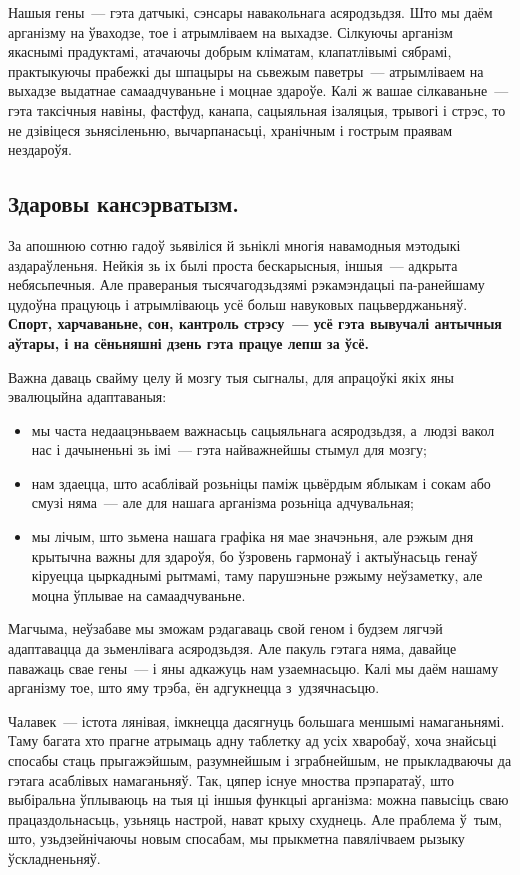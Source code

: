 Нашыя гены~--- гэта датчыкі, сэнсары навакольнага асяродзьдзя. Што мы даём арганізму на ўваходзе, тое і атрымліваем на выхадзе. Сілкуючы арганізм якаснымі прадуктамі, атачаючы добрым кліматам, клапатлівымі сябрамі, практыкуючы прабежкі ды шпацыры на сьвежым паветры~--- атрымліваем на выхадзе выдатнае самаадчуваньне і моцнае здароўе. Калі ж вашае сілкаваньне~--- гэта таксічныя навіны, фастфуд, канапа, сацыяльная ізаляцыя, трывогі і стрэс, то не дзівіцеся зьнясіленьню, вычарпанасьці, хранічным і гострым праявам нездароўя.

\subsection*{Здаровы кансэрватызм.}

За апошнюю сотню гадоў зьявіліся й зьніклі многія навамодныя мэтодыкі аздараўленьня. Нейкія зь іх былі проста бескарысныя, іншыя~--- адкрыта небясьпечныя. Але правераныя тысячагодзьдзямі рэкамэндацыі па-ранейшаму цудоўна працуюць і атрымліваюць усё больш навуковых пацьверджаньняў. \textbf{Спорт, харчаваньне, сон, кантроль стрэсу~--- усё гэта вывучалі антычныя аўтары, і на сёньняшні дзень гэта працуе лепш за ўсё.}

Важна даваць свайму целу й мозгу тыя сыгналы, для апрацоўкі якіх яны эвалюцыйна адаптаваныя: 
\begin{itemize}
  \item мы часта недаацэньваем важнасьць сацыяльнага асяродзьдзя, а~людзі вакол нас і дачыненьні зь імі~--- гэта найважнейшы стымул для мозгу;
  \item нам здаецца, што асаблівай розьніцы паміж цьвёрдым яблыкам і сокам або смузі няма~--- але для нашага арганізма розьніца адчувальная;
  \item мы лічым, што зьмена нашага графіка ня мае значэньня, але рэжым дня крытычна важны для здароўя, бо ўзровень гармонаў і актыўнасьць генаў кіруецца цыркаднымі рытмамі, таму парушэньне рэжыму неўзаметку, але моцна ўплывае на самаадчуваньне.
\end{itemize}

Магчыма, неўзабаве мы зможам рэдагаваць свой геном і будзем лягчэй адаптавацца да зьменлівага асяродзьдзя. Але пакуль гэтага няма, давайце паважаць свае гены~--- і яны адкажуць нам узаемнасьцю. Калі мы даём нашаму арганізму тое, што яму трэба, ён адгукнецца з~удзячнасьцю.

Чалавек~--- істота лянівая, імкнецца дасягнуць большага меншымі намаганьнямі. Таму багата хто прагне атрымаць адну таблетку ад усіх хваробаў, хоча знайсьці спосабы стаць прыгажэйшым, разумнейшым і зграбнейшым, не прыкладваючы да гэтага асаблівых намаганьняў. Так, цяпер існуе мноства прэпаратаў, што выбіральна ўплываюць на тыя ці іншыя функцыі арганізма: можна павысіць сваю працаздольнасьць, узьняць настрой, нават крыху схуднець. Але праблема ў~тым, што, узьдзейнічаючы новым спосабам, мы прыкметна павялічваем рызыку ўскладненьняў. 

